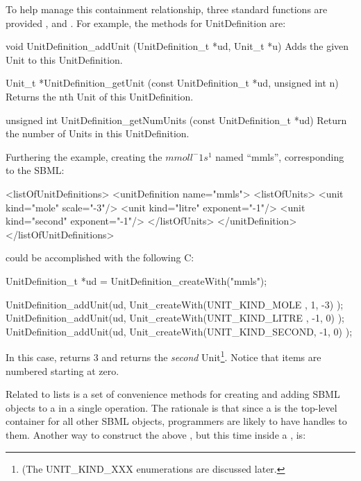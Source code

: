 \documentclass{cekmanual}
\begin{document}
To help manage this containment relationship, three standard functions
are provided ,  and
.  For example, the methods for UnitDefinition
are:


\begin{methoddef}{void UnitDefinition\_addUnit (UnitDefinition\_t *ud,
Unit\_t *u)}
  Adds the given Unit to this UnitDefinition.
\end{methoddef}

\begin{methoddef}{Unit\_t *UnitDefinition\_getUnit (const UnitDefinition\_t
*ud, unsigned int n)}
Returns the nth Unit of this UnitDefinition.
\end{methoddef}

\begin{methoddef}{unsigned int UnitDefinition\_getNumUnits (const
UnitDefinition\_t *ud)}
  Return the number of Units in this UnitDefinition.
\end{methoddef}


Furthering the example, creating the  $mmol l^-1
s^1$ named ``mmls'', corresponding to the SBML:

\begin{example}
<listOfUnitDefinitions>
  <unitDefinition name="mmls">
    <listOfUnits>
      <unit kind="mole"   scale="-3"/>
      <unit kind="litre"  exponent="-1"/>
      <unit kind="second" exponent="-1"/>
    </listOfUnits>
  </unitDefinition>
</listOfUnitDefinitions>
\end{example}


could be accomplished with the following C:

\begin{example}
UnitDefinition_t *ud = UnitDefinition_createWith("mmls");

UnitDefinition_addUnit(ud, Unit_createWith(UNIT_KIND_MOLE  ,  1, -3) );
UnitDefinition_addUnit(ud, Unit_createWith(UNIT_KIND_LITRE , -1,  0) );
UnitDefinition_addUnit(ud, Unit_createWith(UNIT_KIND_SECOND, -1,  0) );
\end{example}


In this case, 
returns 3 and 
returns the \emph{second} Unit\footnote{(The UNIT\_KIND\_XXX
enumerations are discussed later.}.  Notice that items are numbered
starting at zero.

Related to lists is a set of convenience methods for creating and
adding SBML objects to a  in a single operation.  The
rationale is that since a  is the top-level container for
all other SBML objects, programmers are likely to have handles to
them.  Another way to construct the above , but
this time inside a , is:
\end{document}
